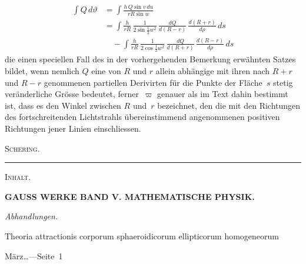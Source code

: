 \documentclass[12pt,a4paper]{article}
\newcommand{\inhaltentry}[3]{%
  \noindent\parbox[t]{0.72\textwidth}{\raggedright #1}%
  \hfill\parbox[t]{0.26\textwidth}{\raggedleft #2\quad---\quad#3}\par
  \vspace{0.3em}
}
\newcommand{\inhaltsection}[1]{%
  \vspace{0.5em}
  \noindent\textit{#1}\par
  \vspace{0.3em}
}
\begin{document}
\newpage
\thispagestyle{bemerkungen}
\setcounter{page}{640}

\begin{align*}
\int Q\,d\vartheta &= \int\frac{h\,Q\sin v\,du}{rR\sin w} \\
&= \int\!\frac{h}{rR}\,\frac{1}{2\sin\!\frac{1}{2}w^2}\,\frac{dQ}{d(R-r)}\,\frac{d(R+r)}{d\rho}\,ds \\
&\quad - \int\!\frac{h}{rR}\,\frac{1}{2\cos\!\frac{1}{2}w^2}\,\frac{dQ}{d(R+r)}\,\frac{d(R-r)}{d\rho}\,ds
\end{align*}
die einen speciellen Fall des in der vorhergehenden Bemerkung erwähnten Satzes bildet, wenn nemlich $Q$ eine von $R$ und $r$ allein abhängige mit ihren nach $R+r$ und $R-r$ genommenen partiellen Derivirten für die Punkte der Fläche~$s$ stetig veränderliche Grösse bedeutet, ferner~$\varpi$ genauer als im Text dahin bestimmt ist, dass es den Winkel zwischen $R$ und~$r$ bezeichnet, den die mit den Richtungen des fortschreitenden Lichtstrahls übereinstimmend angenommenen positiven Richtungen jener Linien einschliessen.

\vspace{2em}

\hfill\textsc{Schering.}

\vfill

\begin{center}
\rule{0.3\textwidth}{0.4pt}
\end{center}

\newpage

\thispagestyle{inhalt}
\setcounter{page}{641}

\begin{center}
\textsc{Inhalt.}
\end{center}

\vspace{1em}

\begin{center}
\textbf{GAUSS WERKE BAND V. MATHEMATISCHE PHYSIK.}
\end{center}

\vspace{1em}

\inhaltsection{Abhandlungen.}

\inhaltentry{Theoria attractionis corporum sphaeroidicorum ellipticorum homogeneorum}{1813 März\ldots}{Seite~1}
\end{document}
